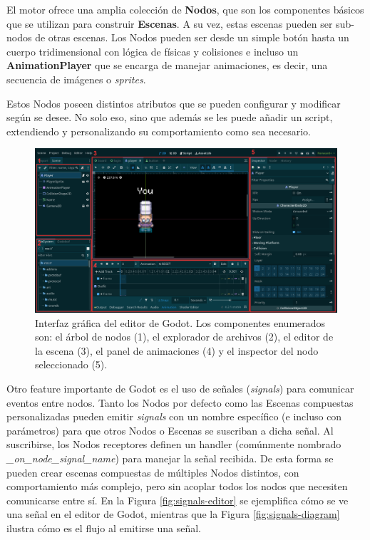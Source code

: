 El motor ofrece una amplia colección de \textbf{Nodos}, que son los componentes básicos que se utilizan para 
construir \textbf{Escenas}. A su vez, estas escenas pueden ser sub-nodos de otras escenas. Los Nodos pueden ser desde un 
simple botón hasta un cuerpo tridimensional con lógica de físicas y colisiones 
e incluso un \textbf{AnimationPlayer} que se encarga de manejar animaciones, 
es decir, una secuencia de imágenes o \textit{sprites}.

Estos Nodos poseen distintos atributos que se pueden configurar y modificar según se desee.
No solo eso, sino que además se les puede añadir un script, extendiendo y personalizando
su comportamiento como sea necesario.

\begin{figure}[htbp]
    \centering
    \includegraphics[width=1.0\textwidth]{../assets/godot-editor.png}
    \caption{Interfaz gráfica del editor de Godot. Los componentes enumerados son: el árbol de nodos (1),
            el explorador de archivos (2), el editor de la escena (3), el panel de animaciones (4) y el
            inspector del nodo seleccionado (5).}
\end{figure}

Otro feature importante de Godot es el uso de señales (\textit{signals}) para comunicar eventos entre nodos.
Tanto los Nodos por defecto como las Escenas compuestas personalizadas pueden emitir \textit{signals} con un nombre específico 
(e incluso con parámetros) para que otros Nodos o Escenas se suscriban a dicha señal. Al suscribirse, los 
Nodos receptores definen un handler (comúnmente nombrado \textit{\_on\_node\_signal\_name}) para manejar 
la señal recibida. De esta forma se pueden crear escenas compuestas de múltiples Nodos distintos, con 
comportamiento más complejo, pero sin acoplar todos los nodos que necesiten comunicarse entre sí. En la
Figura \ref{fig:signals-editor} se ejemplifica cómo se ve una señal en el editor de Godot, mientras que
la Figura \ref{fig:signals-diagram} ilustra cómo es el flujo al emitirse una señal.

